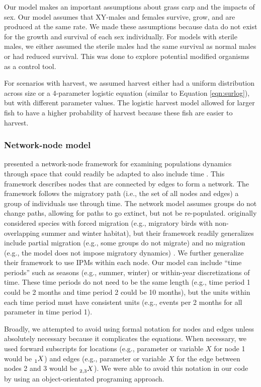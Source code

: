 \documentclass{article}[12pt]
\begin{document}
Our model makes an important assumptions about grass carp and the impacts of sex.
Our model assumes that XY-males and females survive, grow, and are produced at the same rate.
We made these assumptions because data do not exist for the growth and survival of each sex individually.
For models with sterile males, we either assumed the sterile males had the same survival as normal males or had reduced survival. 
This was done to explore potential modified organisms as a control tool.

For scenarios with harvest, we assumed harvest either had a uniform distribution across size or a 
4-parameter logistic equation (similar to Equation \ref{eqn:surlog}), but with different parameter values.
The logistic harvest model allowed for larger fish to have a higher probability of harvest because these fish are easier to harvest. 


\subsubsection{Network-node model}


 \citet{Taylor:2010} presented a network-node framework for examining populations dynamics through space that could readily be adapted to also include time \citep[e.g.,][]{Erickson:2014, Wiederholt:inreview, erickson2016effects}.
This framework describes nodes that are connected by edges to form a network. 
The framework follows the migratory path (i.e., the set of all nodes and edges) a group of individuals use through time.
The network model assumes groups do not change paths, allowing for paths to go extinct, but not be re-populated.
 \citet{Taylor:2010} originally considered species with forced migration (e.g., migratory birds with non-overlapping summer and winter habitat), but their framework readily generalizes include partial migration (e.g., some groups do not migrate) and no migration (e.g., the model does not impose migratory dynamics) \citep{erickson:2017}. 
 We further generalize their framework to use IPMs within each node. 
 Our model can include ``time periods'' such as seasons (e.g., summer, winter) or within-year discretizations of time. 
 These time periods do not need to be the same length (e.g., time period 1 could be 2 months and time period 2 could be 10 months), but the units within each time period must have consistent units (e.g., events per 2 months for all parameter in time period 1).
 
Broadly, we attempted to avoid using formal notation for nodes and edges unless absolutely necessary because it complicates the equations.
When necessary, we used forward subscripts for locations (e.g., parameter or variable \(X\) for node 1 would be \(\prescript{}{1}{X}\)) and edges (e.g.,  parameter or variable \(X\) for the edge between nodes 2 and 3 would be \(\prescript{}{2,3}{X}\)).
We were able to avoid this notation in our code by using an object-orientated programing approach.
\end{document}
